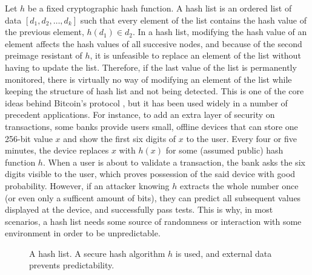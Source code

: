 \medskip
{} 
Let $h$ be a fixed cryptographic hash function. A hash list is an ordered list of data $[d_1,d_2,\dots, d_k]$ such that every element of the list contains the hash value of the previous element, \ie $h(d_1)\in d_2$. In a hash list, modifying the hash value of an element affects the hash values of all succesive nodes, and because of the second preimage resistant of $h$, it is unfeasible to replace an element of the list without having to update the list. Therefore, if the last value of the list is permanently monitored, there is virtually no way of modifying an element of the list while keeping the structure of hash list and not being detected. This is one of the core ideas behind Bitcoin's protocol \cite{whitepaper}, but it has been used widely in a number of precedent applications.  For instance, to add an extra layer of security on transactions, some banks provide users small, offline devices that can store one 256-bit value $x$ and show the first six digits of $x$ to the user. Every four or five minutes, the device replaces $x$ with $h(x)$ for some (assumed public) hash function $h$. When a user is about to validate a transaction, the bank asks the six digits visible to the user, which proves possession of the said device with good probability. However, if an attacker knowing $h$ extracts the whole number once (or even only a sufficent amount of bits), they can predict all subsequent values displayed at the device, and successfully pass tests. This is why, in most scenarios, a hash list needs some source of randomness or interaction with some environment in order to be unpredictable.

\begin{figure}
\label{hashlist}
\centering
{}
\caption{A hash list. A secure hash algorithm $h$ is used, and external data prevents predictability.}
\end{figure}

